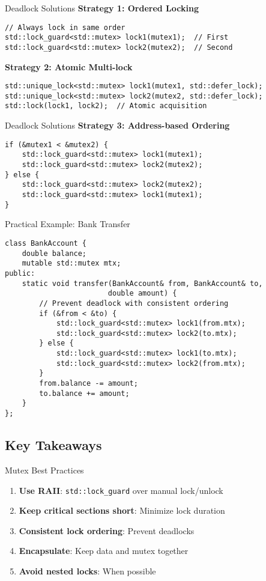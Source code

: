 \begin{frame}[fragile]{Deadlock Solutions}
	\textbf{Strategy 1: Ordered Locking}
	\begin{verbatim}
// Always lock in same order
std::lock_guard<std::mutex> lock1(mutex1);  // First
std::lock_guard<std::mutex> lock2(mutex2);  // Second
	\end{verbatim}

	\textbf{Strategy 2: Atomic Multi-lock}
	\begin{verbatim}
std::unique_lock<std::mutex> lock1(mutex1, std::defer_lock);
std::unique_lock<std::mutex> lock2(mutex2, std::defer_lock);
std::lock(lock1, lock2);  // Atomic acquisition
	\end{verbatim}
\end{frame}

\begin{frame}[fragile]{Deadlock Solutions}
	\textbf{Strategy 3: Address-based Ordering}
	\begin{verbatim}
if (&mutex1 < &mutex2) {
    std::lock_guard<std::mutex> lock1(mutex1);
    std::lock_guard<std::mutex> lock2(mutex2);
} else {
    std::lock_guard<std::mutex> lock2(mutex2);
    std::lock_guard<std::mutex> lock1(mutex1);
}
	\end{verbatim}
\end{frame}

\begin{frame}[fragile]{Practical Example: Bank Transfer}
	\begin{verbatim}
class BankAccount {
    double balance;
    mutable std::mutex mtx;
public:
    static void transfer(BankAccount& from, BankAccount& to,
                        double amount) {
        // Prevent deadlock with consistent ordering
        if (&from < &to) {
            std::lock_guard<std::mutex> lock1(from.mtx);
            std::lock_guard<std::mutex> lock2(to.mtx);
        } else {
            std::lock_guard<std::mutex> lock1(to.mtx);
            std::lock_guard<std::mutex> lock2(from.mtx);
        }
        from.balance -= amount;
        to.balance += amount;
    }
};
	\end{verbatim}
\end{frame}

\subsection{Key Takeaways}
\begin{frame}{Mutex Best Practices}
	\begin{enumerate}
		\item \textbf{Use RAII}: \texttt{std::lock\_guard} over manual lock/unlock
		\item \textbf{Keep critical sections short}: Minimize lock duration
		\item \textbf{Consistent lock ordering}: Prevent deadlocks
		\item \textbf{Encapsulate}: Keep data and mutex together
		\item \textbf{Avoid nested locks}: When possible
	\end{enumerate}
\end{frame}

